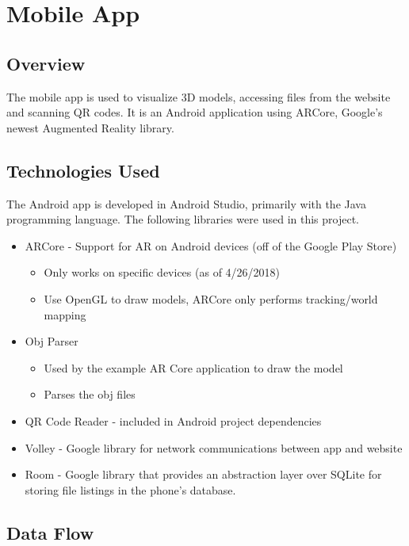 
\section{Mobile App}

    \subsection{Overview}
The mobile app is used to visualize 3D models, accessing files from the website and scanning QR codes. It is an Android application using ARCore, Google's newest Augmented Reality library.
    \subsection{Technologies Used}
The Android app is developed in Android Studio, primarily with the Java programming language. The following libraries were used in this project.
    \begin{itemize}
        \item ARCore - Support for AR on Android devices (off of the Google Play Store)
        \begin{itemize}
            \item Only works on specific devices (as of 4/26/2018)
            \item Use OpenGL to draw models, ARCore only performs tracking/world mapping
        \end{itemize}
        \item Obj Parser
        \begin{itemize}
            \item Used by the example AR Core application to draw the model
            \item Parses the obj files
        \end{itemize}
        \item QR Code Reader - included in Android project dependencies
        \item Volley - Google library for network communications between app and website
        \item Room - Google library that provides an abstraction layer over SQLite for storing file listings in the phone's database.
    \end{itemize}

    \subsection{Data Flow}

